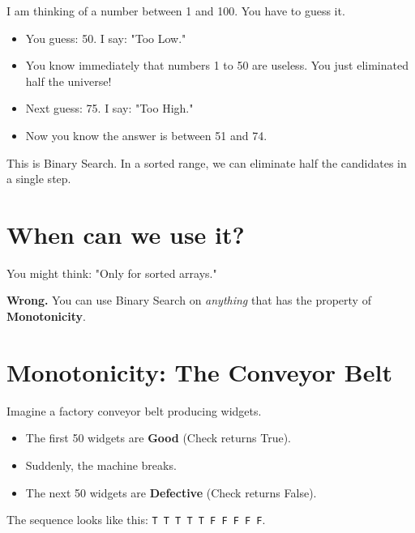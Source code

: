 \documentclass[12pt, a4paper]{report}
\begin{document}
I am thinking of a number between 1 and 100. You have to guess it.

\begin{itemize}

    \item You guess: 50. I say: "Too Low."

    \item You know immediately that numbers 1 to 50 are useless. You just eliminated half the universe!

    \item Next guess: 75. I say: "Too High."

    \item Now you know the answer is between 51 and 74.

\end{itemize}

This is Binary Search. In a sorted range, we can eliminate half the candidates in a single step.



\section{When can we use it?}

You might think: "Only for sorted arrays."

\textbf{Wrong.} You can use Binary Search on \textit{anything} that has the property of \textbf{Monotonicity}.



\section{Monotonicity: The Conveyor Belt}

Imagine a factory conveyor belt producing widgets.

\begin{itemize}

    \item The first 50 widgets are \textbf{Good} (Check returns True).

    \item Suddenly, the machine breaks.

    \item The next 50 widgets are \textbf{Defective} (Check returns False).

\end{itemize}

The sequence looks like this: \texttt{T T T T T F F F F F}.
\end{document}
